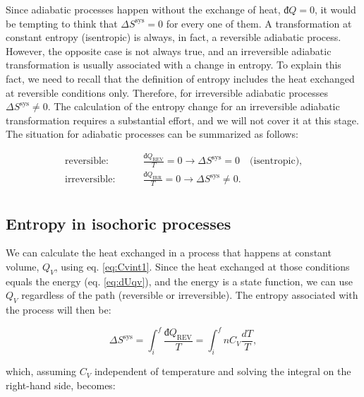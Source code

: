 \documentclass[
  9pt,
]{extbook}
\theoremstyle{definition}
\theoremstyle{definition}
\theoremstyle{definition}
\theoremstyle{remark}
\begin{document}
Since adiabatic processes happen without the exchange of heat, \(đQ=0\), it would be tempting to think that \(\Delta S^{\mathrm{sys}} = 0\) for every one of them. A transformation at constant entropy (isentropic) is always, in fact, a reversible adiabatic process. However, the opposite case is not always true, and an irreversible adiabatic transformation is usually associated with a change in entropy. To explain this fact, we need to recall that the definition of entropy includes the heat exchanged at reversible conditions only. Therefore, for irreversible adiabatic processes \(\Delta S^{\mathrm{sys}} \neq 0\). The calculation of the entropy change for an irreversible adiabatic transformation requires a substantial effort, and we will not cover it at this stage. The situation for adiabatic processes can be summarized as follows:

\begin{equation}
\begin{aligned}
\text{reversible:} \qquad & \frac{đQ_{\mathrm{REV}}}{T} = 0 \longrightarrow \Delta S^{\mathrm{sys}} = 0 \quad \text{(isentropic),}\\
\text{irreversible:} \qquad & \frac{đQ_{\mathrm{IRR}}}{T}  = 0 \longrightarrow \Delta S^{\mathrm{sys}} \neq 0. \\
\end{aligned}
\label{eq:adiabaticent}
\end{equation}

\hypertarget{entropy-in-isochoric-processes}{%
\subsection{Entropy in isochoric processes}\label{entropy-in-isochoric-processes}}

We can calculate the heat exchanged in a process that happens at constant volume, \(Q_V\), using eq. \eqref{eq:Cvint1}. Since the heat exchanged at those conditions equals the energy (eq. \eqref{eq:dUqv}), and the energy is a state function, we can use \(Q_V\) regardless of the path (reversible or irreversible). The entropy associated with the process will then be:

\begin{equation}
\Delta S^{\mathrm{sys}} = \int_i^f \frac{đQ_{\mathrm{REV}}}{T} = \int_i^f nC_V \frac{dT}{T},
\label{eq:sconstV1}
\end{equation}

which, assuming \(C_V\) independent of temperature and solving the integral on the right-hand side, becomes:
\end{document}
